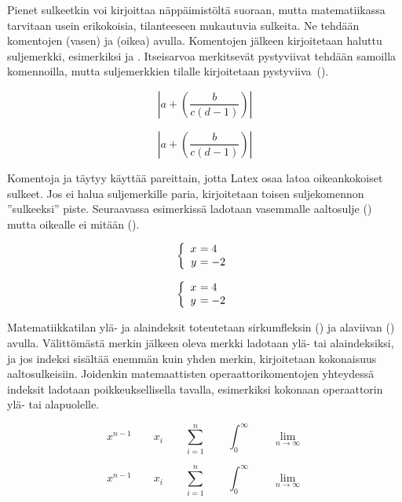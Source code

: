 Pienet sulkeetkin voi kirjoittaa näppäimistöltä suoraan, mutta
matematiikassa tarvitaan usein erikokoisia, tilanteeseen mukautuvia
sulkeita. Ne tehdään komentojen  (vasen) ja
 (oikea) avulla. Komentojen jälkeen kirjoitetaan haluttu
suljemerkki, esimerkiksi \mkomentojatko{(} ja
\mkomentojatko{)}. Itseisarvoa merkitsevät pystyviivat
tehdään samoilla komennoilla, mutta suljemerkkien tilalle kirjoitetaan
pystyviiva~(\koodi{|}).

\begin{koodilohkosis}
\[ \left| a + \left( \frac{b}{c \left( d-1 \right)} \right) \right| \]
\end{koodilohkosis}
\[ \left| a + \left( \frac{b}{c \left( d-1 \right)} \right) \right| \]

\noindent
Komentoja  ja  täytyy käyttää pareittain,
jotta Latex osaa latoa oikeankokoiset sulkeet. Jos ei halua
suljemerkille paria, kirjoitetaan toisen suljekomennon ''sulkeeksi''
piste. Seuraavassa esimerkissä ladotaan vasemmalle aaltosulje
(\mkomentojatko{\keno\{}) mutta oikealle ei mitään
().

\begin{koodilohkosis}
\[ \left\{ \begin{array}{r@{~}l}
             x &= 4 \\
             y &= -2 \\
           \end{array} \right. \]
\end{koodilohkosis}
\[ \left\{ \begin{array}{l@{~}l}
             x &= 4 \\
             y &= -2 \\
    \end{array} \right. \]

\noindent
Matematiikkatilan ylä- ja alaindeksit toteutetaan sirkumfleksin
(\koodi{\^{}}) ja alaviivan (\koodi{\_}) avulla. Välittömästä merkin
jälkeen oleva merkki ladotaan ylä- tai alaindeksiksi, ja jos indeksi
sisältää enemmän kuin yhden merkin, kirjoitetaan kokonaisuus
aaltosulkeisiin. Joidenkin matemaattisten operaattorikomentojen
yhteydessä indeksit ladotaan poikkeuksellisella tavalla, esimerkiksi
kokonaan operaattorin ylä- tai alapuolelle.

\begin{koodilohkosis}
\[ x^{n-1} \qquad x_i \qquad \sum_{i=1}^n \qquad
  \int_0^\infty \qquad \lim_{n \to \infty} \]
\end{koodilohkosis}
\[ x^{n-1} \qquad x_i \qquad \sum_{i=1}^n \qquad
  \int_0^\infty \qquad \lim_{n \to \infty} \]

